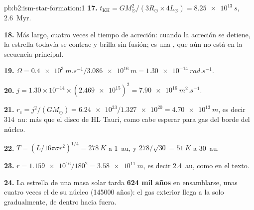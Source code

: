 \begin{solution}{pb:b2:ism-star-formation:1}
\textbf{17.} $t_{\mathrm{KH}} = GM_\odot^2/(3R_\odot\times4L_\odot) = \qty{8.25e13}{s}$,
\qty{2.6}{Myr}.

\textbf{18.} Más largo, cuatro veces el tiempo de acreción: cuando la acreción se detiene, la estrella
todavía se contrae y brilla sin fusión; es una , que aún no está en la secuencia
principal.

\textbf{19.} $\Omega = \qty{0.4e3}{m.s^{-1}}/\qty{3.086e16}{m} = \qty{1.30e-14}{rad.s^{-1}}$.

\textbf{20.} $j = 1.30\times10^{-14}\times(\num{2.469e15})^2 = \qty{7.90e16}{m^2.s^{-1}}$.

\textbf{21.} $r_c = j^2/(GM_\odot) = \num{6.24e33}/\num{1.327e20} = \qty{4.70e13}{m}$, es
decir \qty{314}{au}: más que el disco de HL Tauri, como cabe esperar para gas del borde del
núcleo.

\textbf{22.} $T = (L/16\pi\sigma r^2)^{1/4} = \qty{278}{K}$ a \qty{1}{au}, y
$278/\sqrt{30} = \qty{51}{K}$ a \qty{30}{au}.

\textbf{23.} $r = \num{1.159e16}/180^2 = \qty{3.58e11}{m}$, es decir \qty{2.4}{au}, como en el texto.

\textbf{24.} La estrella de una masa solar tarda
\textbf{\qty[text-series-to-math=true]{624}{} mil años} en ensamblarse, unas cuatro
veces el  de su núcleo (\num{145000} años): el gas exterior llega a la
 solo gradualmente, de dentro hacia fuera.
\end{solution}
